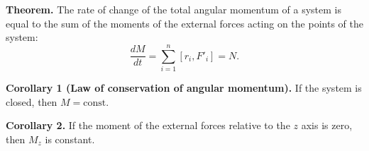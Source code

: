 \textbf{Theorem.} The rate of change of the total angular momentum of a system is equal to the sum of the moments of the external forces acting on the points of the system:
$$\frac{dM}{dt} = \sum_{i=1}^{n} [r_i, F'_i] = N.$$

\textbf{Corollary 1 (Law of conservation of angular momentum).} If the system is closed, then $M = \text{const}$.

\textbf{Corollary 2.} If the moment of the external forces relative to the $z$ axis is zero, then $M_z$ is constant.
